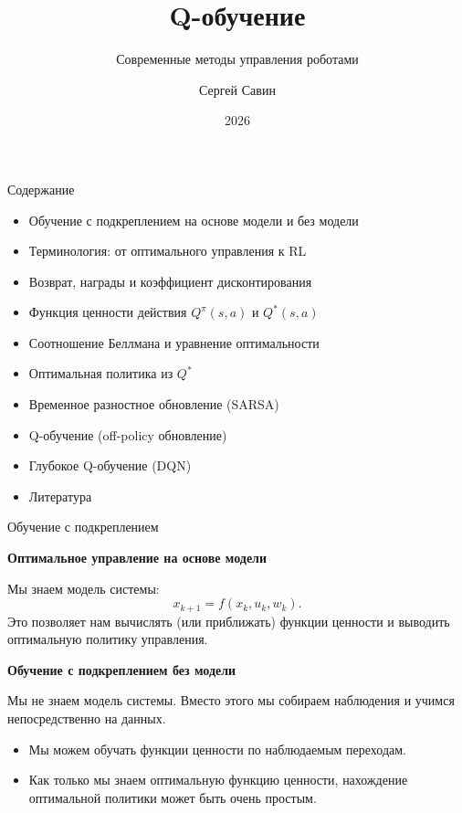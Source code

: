 \documentclass{beamer}
\subtitle{Современные методы управления роботами}
\author{Сергей Савин}
\date{2026}
\title{Q-обучение}
\begin{document}
	\maketitle
	
	
	\begin{frame}{Содержание}
		\begin{itemize}
			\item Обучение с подкреплением на основе модели и без модели
			\item Терминология: от оптимального управления к RL
			\item Возврат, награды и коэффициент дисконтирования
			\item Функция ценности действия $Q^\pi(s,a)$ и $Q^*(s,a)$
			\item Соотношение Беллмана и уравнение оптимальности
			\item Оптимальная политика из $Q^*$
			\item Временное разностное обновление (SARSA)
			\item Q-обучение (off-policy обновление)
			\item Глубокое Q-обучение (DQN)
			\item Литература
		\end{itemize}
	\end{frame}
	
	
	\begin{frame}{Обучение с подкреплением}
		\begin{flushleft}
			
			\textbf{Оптимальное управление на основе модели}
			
			Мы знаем модель системы:
			\[
			x_{k+1}=f(x_k,u_k,w_k).
			\]
			Это позволяет нам вычислять (или приближать) функции ценности
			и выводить оптимальную политику управления.
			
			\vspace{0.4cm}
			
			\textbf{Обучение с подкреплением без модели}
			
			Мы не знаем модель системы. Вместо этого мы собираем
			наблюдения и учимся непосредственно на данных.
			
			\vspace{0.3cm}
			
			\begin{itemize}
				\item Мы можем обучать функции ценности по наблюдаемым переходам.
				\item Как только мы знаем оптимальную функцию ценности, нахождение
				оптимальной политики может быть очень простым.
			\end{itemize}
		\end{flushleft}
	\end{frame}
	
\end{document}

